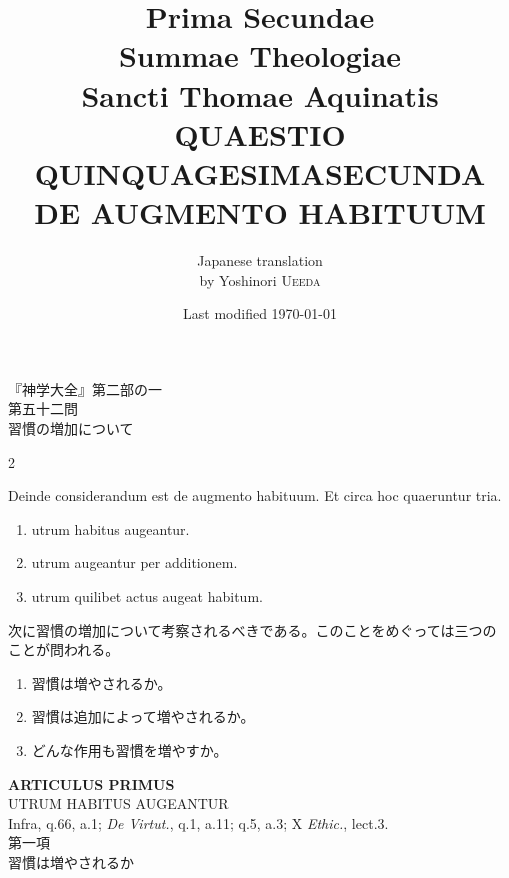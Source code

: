 \documentclass[paper=a4paper,fontsize=10pt,jafontsize=9pt,titlepage]{jlreq}
\title{{\bfseries Prima Secundae}\\{\Huge Summae Theologiae}\\Sancti Thomae
Aquinatis\\{\sffamily QUAESTIO QUINQUAGESIMASECUNDA}\\{\bfseries DE AUGMENTO
HABITUUM}}
\author{Japanese translation\\by Yoshinori {\scshape Ueeda}}
\date{Last modified \today}
\begin{document}
\maketitle
\thispagestyle{empty}
\begin{center}
{\Large 『神学大全』第二部の一\\第五十二問\\習慣の増加について}
\end{center}


\begin{paracol}{2}

Deinde considerandum est de augmento habituum. Et circa hoc quaeruntur
tria. 

\begin{enumerate}
 \item utrum habitus augeantur.
 \item utrum augeantur per additionem.
 \item utrum quilibet actus augeat habitum.
\end{enumerate}

\switchcolumn

次に習慣の増加について考察されるべきである。このことをめぐっては三つの
 ことが問われる。
\begin{enumerate}
 \item 習慣は増やされるか。
 \item 習慣は追加によって増やされるか。
 \item どんな作用も習慣を増やすか。
\end{enumerate}

\end{paracol}



\newpage
{}
{}
\setcounter{section}{1}
\setcounter{subsection}{0}

\begin{center}
{\Large {\bfseries ARTICULUS PRIMUS}}\\
{\large UTRUM HABITUS AUGEANTUR}\\
{\footnotesize Infra, q.66, a.1; {\itshape De Virtut.}, q.1, a.11;
 q.5, a.3; X {\itshape Ethic.}, lect.3.}\\
{\Large 第一項\\習慣は増やされるか}
\end{center}
\end{document}
